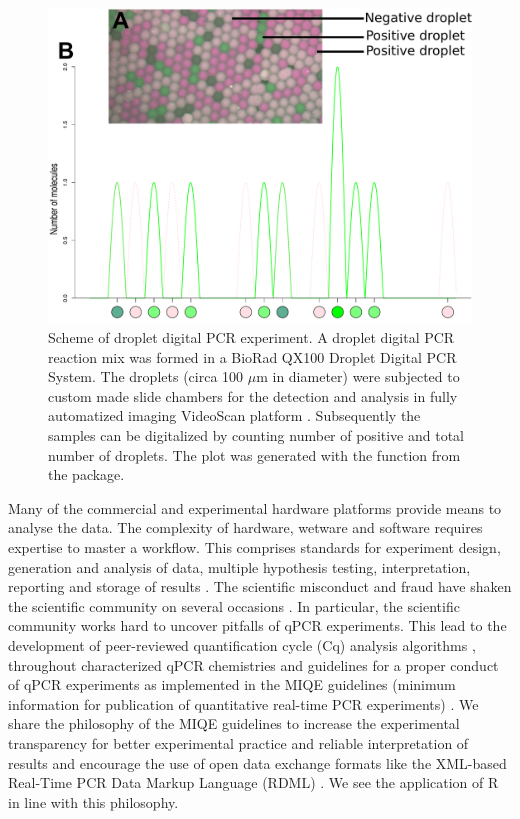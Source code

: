 \begin{figure}[htbp]
  \centering
  \includegraphics[clip=true, width=14cm]{figures/dpcR_sim.pdf}
  \caption{Scheme of droplet digital PCR experiment.  A droplet 
digital PCR reaction mix was formed in a BioRad QX100 Droplet Digital PCR System. The droplets 
(circa 100 $\mu$m in diameter) were subjected to custom made slide chambers for 
the detection and analysis in fully automatized imaging VideoScan platform
\citep{rodiger_highly_2013}.  Subsequently the samples can be 
digitalized by counting number of positive and total number of droplets. The 
plot was generated with the  function from the  
package.}
\label{figure:dpcR_sim}
\end{figure}

Many of the commercial and experimental hardware platforms provide means to 
analyse the data. The complexity of hardware, wetware and software requires 
expertise to master a workflow. This comprises standards for experiment design, 
generation and analysis of data, multiple hypothesis testing, interpretation, 
reporting and storage of 
results \citep{huggett_BDQ_2014, conde_2014}. The scientific misconduct and 
fraud have shaken 
the scientific community on several occasions \citep{bustin_2014}. In 
particular, 
the scientific community works hard to uncover pitfalls of qPCR experiments. 
This 
lead to the development of peer-reviewed quantification cycle (Cq) analysis 
algorithms \citep{ruijter_2013}, throughout characterized qPCR chemistries 
\citep{ruijter_2014} and guidelines for a proper conduct of qPCR experiments as 
implemented in the MIQE guidelines (minimum information for publication of 
quantitative real-time PCR experiments) \citep{huggett_2013, bustin_2014}. 
We share the philosophy of the MIQE guidelines to increase the experimental 
transparency for better experimental practice and reliable interpretation of 
results and encourage the use of open data exchange formats like the XML-based 
Real-Time PCR Data Markup Language (RDML) \citep{lefever_2009}. We see the 
application of R in line with this philosophy. 

